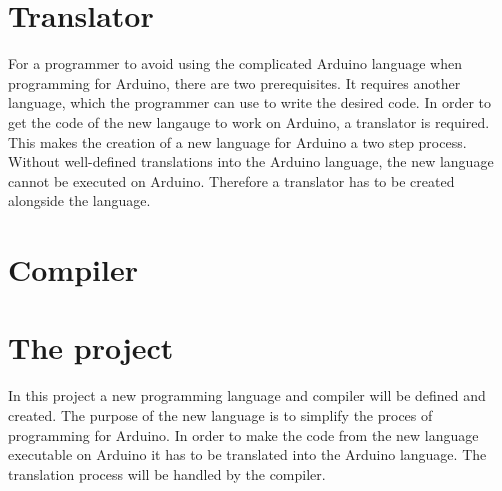 \section{Translator}
For a programmer to avoid using the complicated Arduino language when programming for Arduino, there are two prerequisites. It requires another language, which the programmer can use to write the desired code. In order to get the code of the new langauge to work on Arduino, a translator is required. This makes the creation of a new language for Arduino a two step process. Without well-defined translations into the Arduino language, the new language cannot be executed on Arduino. Therefore a translator has to be created alongside the language.

\section{Compiler}

\section{The project}
In this project a new programming language and compiler will be defined and created. The purpose of the new language is to simplify the proces of programming for Arduino. In order to make the code from the new language executable on Arduino it has to be translated into the Arduino language. The translation process will be handled by the compiler. 
